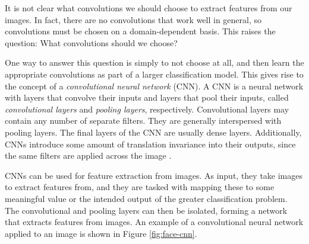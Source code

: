         It is not clear what convolutions we should choose to extract features
        from our images. In fact, there are no convolutions that work well in
        general, so convolutions must be chosen on a domain-dependent basis.
        This raises the question: What convolutions should we choose?

        One way to answer this question is simply to not choose at all, and
        then learn the appropriate convolutions as part of a larger
        classification model. This gives rise to the concept of a
        \emph{convolutional neural network} (CNN). A CNN is a neural network
        with layers that convolve their inputs and layers that pool their
        inputs, called \emph{convolutional layers} and \emph{pooling layers},
        respectively. Convolutional layers may contain any number of separate
        filters. They are generally interspersed with pooling layers. The final
        layers of the CNN are usually dense layers. Additionally, CNNs introduce some amount of translation invariance into their outputs, since the same filters are applied across the image \citep{lecun98}.

        CNNs can be used for feature extraction from images. As input, they
        take images to extract features from, and they are tasked with mapping
        these to some meaningful value or the intended output of the greater
        classification problem. The convolutional and pooling layers can then
        be isolated, forming a network that extracts features from images. An
        example of a convolutional neural network applied to an image is shown
        in Figure \ref{fig:face-cnn}.


